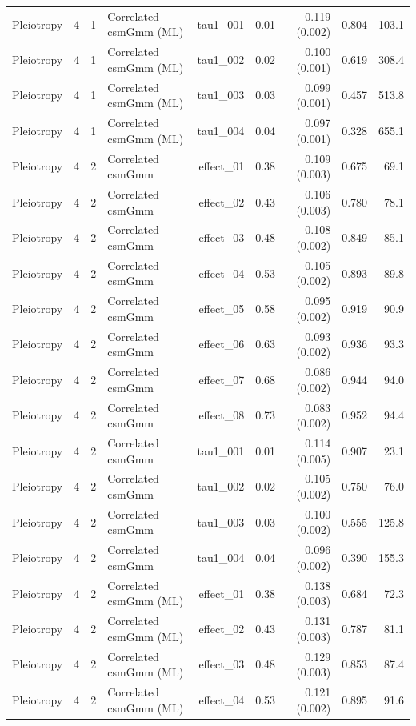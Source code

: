 \begin{longtable}{lcclrrrrr}
Pleiotropy & 4 & 1 & Correlated csmGmm (ML) & tau1\_001 & 0.01 & 0.119 (0.002) & 0.804 & 103.1\\
Pleiotropy & 4 & 1 & Correlated csmGmm (ML) & tau1\_002 & 0.02 & 0.100 (0.001) & 0.619 & 308.4\\
Pleiotropy & 4 & 1 & Correlated csmGmm (ML) & tau1\_003 & 0.03 & 0.099 (0.001) & 0.457 & 513.8\\
Pleiotropy & 4 & 1 & Correlated csmGmm (ML) & tau1\_004 & 0.04 & 0.097 (0.001) & 0.328 & 655.1\\
Pleiotropy & 4 & 2 & Correlated csmGmm & effect\_01 & 0.38 & 0.109 (0.003) & 0.675 & 69.1\\
Pleiotropy & 4 & 2 & Correlated csmGmm & effect\_02 & 0.43 & 0.106 (0.003) & 0.780 & 78.1\\
Pleiotropy & 4 & 2 & Correlated csmGmm & effect\_03 & 0.48 & 0.108 (0.002) & 0.849 & 85.1\\
Pleiotropy & 4 & 2 & Correlated csmGmm & effect\_04 & 0.53 & 0.105 (0.002) & 0.893 & 89.8\\
Pleiotropy & 4 & 2 & Correlated csmGmm & effect\_05 & 0.58 & 0.095 (0.002) & 0.919 & 90.9\\
Pleiotropy & 4 & 2 & Correlated csmGmm & effect\_06 & 0.63 & 0.093 (0.002) & 0.936 & 93.3\\
Pleiotropy & 4 & 2 & Correlated csmGmm & effect\_07 & 0.68 & 0.086 (0.002) & 0.944 & 94.0\\
Pleiotropy & 4 & 2 & Correlated csmGmm & effect\_08 & 0.73 & 0.083 (0.002) & 0.952 & 94.4\\
Pleiotropy & 4 & 2 & Correlated csmGmm & tau1\_001 & 0.01 & 0.114 (0.005) & 0.907 & 23.1\\
Pleiotropy & 4 & 2 & Correlated csmGmm & tau1\_002 & 0.02 & 0.105 (0.002) & 0.750 & 76.0\\
Pleiotropy & 4 & 2 & Correlated csmGmm & tau1\_003 & 0.03 & 0.100 (0.002) & 0.555 & 125.8\\
Pleiotropy & 4 & 2 & Correlated csmGmm & tau1\_004 & 0.04 & 0.096 (0.002) & 0.390 & 155.3\\
Pleiotropy & 4 & 2 & Correlated csmGmm (ML) & effect\_01 & 0.38 & 0.138 (0.003) & 0.684 & 72.3\\
Pleiotropy & 4 & 2 & Correlated csmGmm (ML) & effect\_02 & 0.43 & 0.131 (0.003) & 0.787 & 81.1\\
Pleiotropy & 4 & 2 & Correlated csmGmm (ML) & effect\_03 & 0.48 & 0.129 (0.003) & 0.853 & 87.4\\
Pleiotropy & 4 & 2 & Correlated csmGmm (ML) & effect\_04 & 0.53 & 0.121 (0.002) & 0.895 & 91.6\\

\end{longtable}
